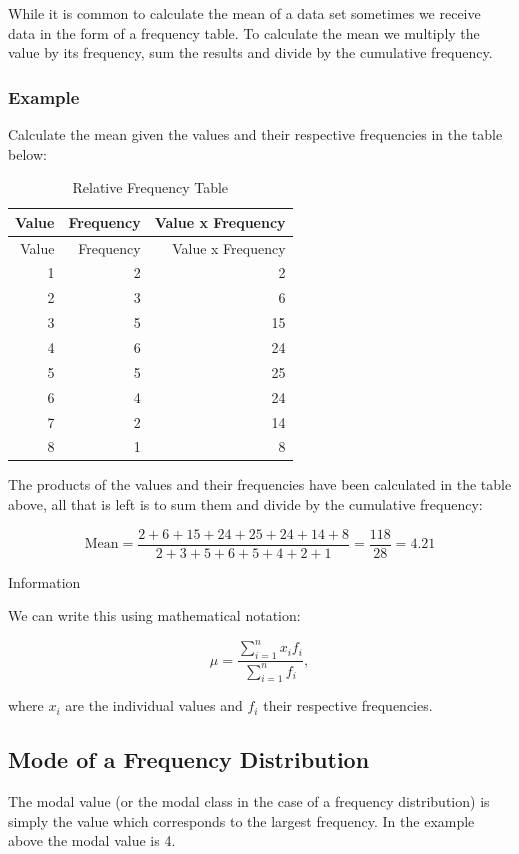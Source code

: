 \documentclass[
]{book}
\begin{document}
While it is common to calculate the mean of a data set sometimes we receive data in the form of a frequency table. To calculate the mean we multiply the value by its frequency, sum the results and divide by the cumulative frequency.

\hypertarget{example-6}{%
\subsubsection{Example}\label{example-6}}

Calculate the mean given the values and their respective frequencies in the table below:

\begin{longtable}[]{@{}rrr@{}}
\caption{\label{tab:table07}Relative Frequency Table}\tabularnewline
\toprule
Value & Frequency & Value x Frequency \\
\midrule
\endfirsthead
\toprule
Value & Frequency & Value x Frequency \\
\midrule
\endhead
1 & 2 & 2 \\
2 & 3 & 6 \\
3 & 5 & 15 \\
4 & 6 & 24 \\
5 & 5 & 25 \\
6 & 4 & 24 \\
7 & 2 & 14 \\
8 & 1 & 8 \\
\bottomrule
\end{longtable}

The products of the values and their frequencies have been calculated in the table above, all that is left is to sum them and divide by the cumulative frequency:

\[ \textrm{Mean}=\frac{2+6+15+24+25+24+14+8}{2+3+5+6+5+4+2+1}=\frac{118}{28}=4.21 \]

Information

We can write this using mathematical notation:

\[\mu=\frac{\sum_{i=1}^n x_i f_i}{\sum_{i=1}^n f_i},\]

where \(x_i\) are the individual values and \(f_i\) their respective frequencies.

\hypertarget{mode-of-a-frequency-distribution}{%
\subsection{Mode of a Frequency Distribution}\label{mode-of-a-frequency-distribution}}

The modal value (or the modal class in the case of a frequency distribution) is simply the value which corresponds to the largest frequency. In the example above the modal value is 4.
\end{document}
